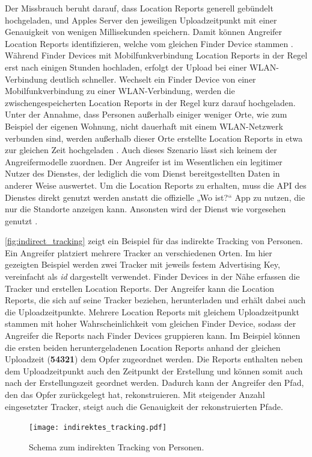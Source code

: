 Der Missbrauch beruht darauf, dass Location Reports generell gebündelt hochgeladen, und Apples Server den jeweiligen Uploadzeitpunkt mit einer Genauigkeit von wenigen Millisekunden speichern.
Damit können Angreifer Location Reports identifizieren, welche vom gleichen Finder Device stammen \cite{Tonetto_FindMy}.
Während Finder Devices mit Mobilfunkverbindung Location Reports in der Regel erst nach einigen Stunden hochladen, erfolgt der Upload bei einer WLAN-Verbindung deutlich schneller.
Wechselt ein Finder Device von einer Mobilfunkverbindung zu einer WLAN-Verbindung, werden die zwischengespeicherten Location Reports in der Regel kurz darauf hochgeladen.
Unter der Annahme, dass Personen außerhalb einiger weniger Orte, wie zum Beispiel der eigenen Wohnung, nicht dauerhaft mit einem WLAN-Netzwerk verbunden sind, werden außerhalb dieser Orte erstellte Location Reports in etwa zur gleichen Zeit hochgeladen \cite{Tonetto_FindMy}.
Auch dieses Szenario lässt sich keinem der Angreifermodelle zuordnen. 
Der Angreifer ist im Wesentlichen ein legitimer Nutzer des Dienstes, der lediglich die vom Dienst bereitgestellten Daten in anderer Weise auswertet.
Um die Location Reports zu erhalten, muss die \ac{API} des Dienstes direkt genutzt werden anstatt die offizielle „Wo ist?“ App zu nutzen, die nur die Standorte anzeigen kann.
Ansonsten wird der Dienst wie vorgesehen genutzt \cite{Tonetto_FindMy}.

\autoref{fig:indirect_tracking} zeigt ein Beispiel für das indirekte Tracking von Personen.
Ein Angreifer platziert mehrere Tracker an verschiedenen Orten.
Im hier gezeigten Beispiel werden zwei Tracker mit jeweils festem Advertising Key, vereinfacht als \textit{id} dargestellt verwendet.
Finder Devices in der Nähe erfassen die Tracker und erstellen Location Reports.
Der Angreifer kann die Location Reports, die sich auf seine Tracker beziehen, herunterladen und erhält dabei auch die Uploadzeitpunkte.
Mehrere Location Reports mit gleichem Uploadzeitpunkt stammen mit hoher Wahrscheinlichkeit vom gleichen Finder Device, sodass der Angreifer die Reports nach Finder Devices gruppieren kann.
Im Beispiel können die ersten beiden heruntergeladenen Location Reports anhand der gleichen Uploadzeit (\textbf{54321}) dem Opfer zugeordnet werden.
Die Reports enthalten neben dem Uploadzeitpunkt auch den Zeitpunkt der Erstellung und können somit auch nach der Erstellungszeit geordnet werden.
Dadurch kann der Angreifer den Pfad, den das Opfer zurückgelegt hat, rekonstruieren.
Mit steigender Anzahl eingesetzter Tracker, steigt auch die Genauigkeit der rekonstruierten Pfade.
\begin{figure}[ht]
  \centering
  \texttt{[image: indirektes\_tracking.pdf]}
  \caption{Schema zum indirekten Tracking von Personen.}
  \label{fig:indirect_tracking}
\end{figure}

